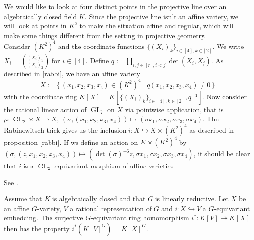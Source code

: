 \begin{dexample}\label{domcr}
  We would like to look at four distinct points in the projective line over an algebraically closed field $K$.
  Since the projective line isn't an affine variety, we will look at points in $K^2$ to make the situation affine and regular, which will make some things different from the setting in projective geometry.\\
  Consider $(K^2)^4$ and the coordinate functions $\{(X_i)_k\}_{i \in [4], k \in [2]}$.
  We write $X_i = \binom{(X_i)_1}{(X_i)_2}$ for $i \in [4]$.
  Define $q := \prod_{i,j \in [r], i<j} \operatorname{det}(X_i,X_j)$.
  As described in \ref{rabbi}, we have an affine variety
  \begin{equation}
    X := \{\, (x_1,x_2,x_3,x_4) \in (K^2)^4 \mid q(x_1,x_2,x_3,x_4) \neq 0 \,\}
  \end{equation}
  with the coordinate ring $K[X] = K[\{(X_i)_k\}_{i \in [4], k \in [2]},q^{-1}]$.
  Now consider the rational linear action of $\operatorname{GL}_2$ on $X$ via pointwise application, that is $\mu \colon \operatorname{GL}_2 \times X \rightarrow X$, $(\sigma,(x_1,x_2,x_3,x_4)) \mapsto (\sigma x_1,\sigma x_2,\sigma x_3,\sigma x_4)$.
  The Rabinowitsch-trick gives us the inclusion $i \colon X \hookrightarrow K \times (K^2)^4$ as described in proposition \ref{rabbi}.
  If we define an action on $K \times (K^2)^4$ by $(\sigma,(z,x_1,x_2,x_3,x_4)) \mapsto (\operatorname{det}(\sigma)^{-6}z,\sigma x_1,\sigma x_2,\sigma x_3,\sigma x_4)$, it should be clear that $i$ is a $\operatorname{GL}_2$-equivariant morphism of affine varieties.
\end{dexample}

\begin{lemma}\label{foremb}
  See \cite[2.2.9]{DK15}.
  
  Assume that $K$ is algebraically closed and that $G$ is linearly reductive.
  Let $X$ be an affine $G$-variety, $V$ a rational representation of $G$ and $i \colon X \hookrightarrow V$ a $G$-equivariant embedding.
  The surjective $G$-equivariant ring homomorphism $i^\ast \colon K[V] \twoheadrightarrow K[X]$ then has the property $i^\ast (K[V]^G) = K[X]^G$.
\end{lemma}

